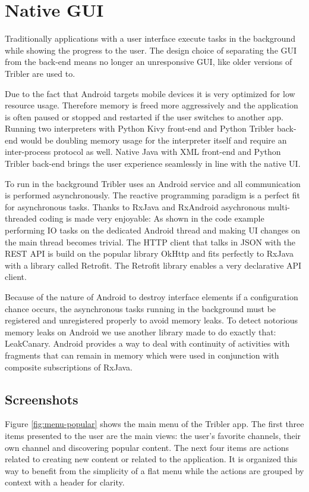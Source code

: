 \section{Native GUI}
Traditionally applications with a user interface execute tasks in the background while showing the progress to the user.
The design choice of separating the GUI from the back-end means no longer an unresponsive GUI, like older versions of Tribler are used to.

Due to the fact that Android targets mobile devices it is very optimized for low resource usage.
Therefore memory is freed more aggressively and the application is often paused or stopped and restarted if the user switches to another app.
Running two interpreters with Python Kivy front-end and Python Tribler back-end would be doubling memory usage for the interpreter itself and require an inter-process protocol as well.
Native Java with XML front-end and Python Tribler back-end brings the user experience seamlessly in line with the native UI.

To run in the background Tribler uses an Android service and all communication is performed asynchronously.
The reactive programming paradigm is a perfect fit for asynchronous tasks.
Thanks to RxJava and RxAndroid asychronous multi-threaded coding is made very enjoyable:
As shown in the code example performing IO tasks on the dedicated Android thread and making UI changes on the main thread becomes trivial.
The HTTP client that talks in JSON with the REST API is build on the popular library OkHttp and fits perfectly to RxJava with a library called Retrofit.
The Retrofit library enables a very declarative API client.

Because of the nature of Android to destroy interface elements if a configuration chance occurs, the asynchronous tasks running in the background must be registered and unregistered properly to avoid memory leaks.
To detect notorious memory leaks on Android we use another library made to do exactly that: LeakCanary.
Android provides a way to deal with continuity of activities with fragments that can remain in memory which were used in conjunction with composite subscriptions of RxJava.

\subsection{Screenshots}
Figure \ref{fig:menu-popular} shows the main menu of the Tribler app.
The first three items presented to the user are the main views: the user's favorite channels, their own channel and discovering popular content.
The next four items are actions related to creating new content or related to the application.
It is organized this way to benefit from the simplicity of a flat menu while the actions are grouped by context with a header for clarity.

